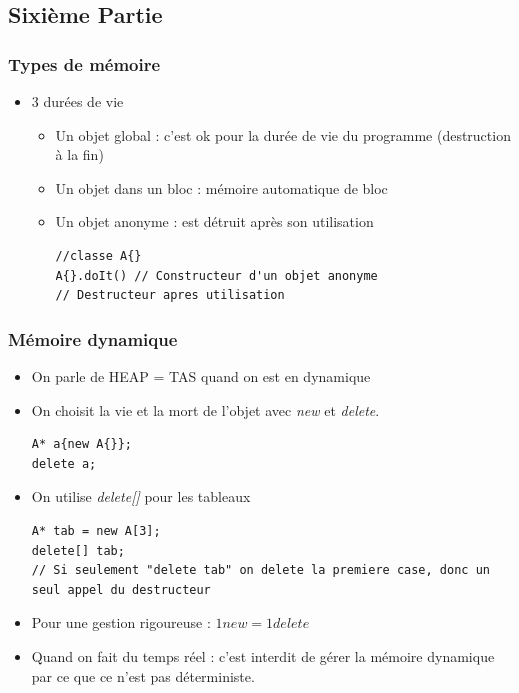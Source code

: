 \documentclass[12pt,a4paper]{article}
\begin{document}
\subsection{Sixième Partie}
\subsubsection{Types de mémoire}
\begin{itemize}
\item 3 durées de vie
\begin{itemize}
\item Un objet global : c'est ok pour la durée de vie du programme (destruction à la fin)
\item Un objet dans un bloc : mémoire automatique de bloc
\item Un objet anonyme : est détruit après son utilisation
\begin{lstlisting}
//classe A{}
A{}.doIt() // Constructeur d'un objet anonyme
// Destructeur apres utilisation
\end{lstlisting}
\end{itemize}
\end{itemize}
\subsubsection{Mémoire dynamique}
\begin{itemize}
\item On parle de HEAP = TAS quand on est en dynamique
\item On choisit la vie et la mort de l'objet avec \textit{new} et \textit{delete}.
\begin{lstlisting}
A* a{new A{}};
delete a;
\end{lstlisting}
\item On utilise \textit{delete[]} pour les tableaux
\begin{lstlisting}
A* tab = new A[3];
delete[] tab;
// Si seulement "delete tab" on delete la premiere case, donc un seul appel du destructeur
\end{lstlisting}
\item Pour une gestion rigoureuse : $1 new = 1 delete$
\item Quand on fait du temps réel : c'est interdit de gérer la mémoire dynamique par ce que ce n'est pas déterministe.
\end{itemize}
\end{document}
